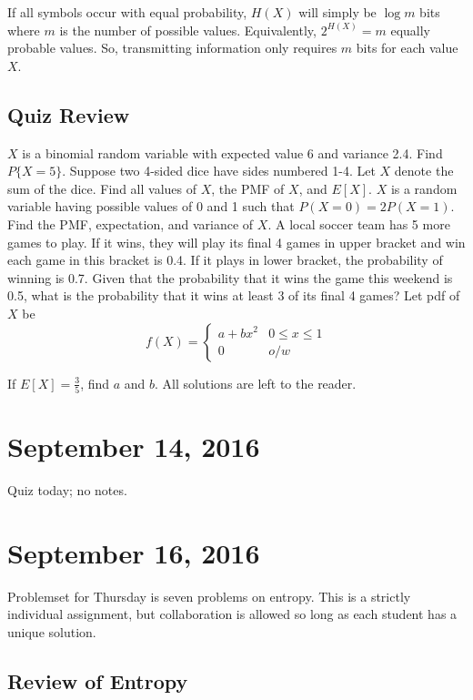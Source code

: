\documentclass[11pt]{article}
\theoremstyle{definition}
\begin{document}
\remark If all symbols occur with equal probability, $H(X)$ will simply be $\log m$ bits where $m$ is the number of possible values. Equivalently, $2^{H(X)} = m$ equally probable values. So, transmitting information only requires $m$ bits for each value $X$. 

\subsection{Quiz Review}

\example $X$ is a binomial random variable with expected value 6 and variance 2.4. Find $P\{X=5\}$.
\example Suppose two 4-sided dice have sides numbered 1-4. Let $X$ denote the sum of the dice. Find all values of $X$, the PMF of $X$, and $E[X]$.
\example $X$ is a random variable having possible values of 0 and 1 such that $P(X=0) = 2P(X=1)$. Find the PMF, expectation, and variance of $X$. 
\example A local soccer team has 5 more games to play. If it wins, they will play its final 4 games in upper bracket and win each game in this bracket is 0.4. If it plays in lower bracket, the probability of winning is 0.7. Given that the probability that it wins the game this weekend is 0.5, what is the probability that it wins at least 3 of its final 4 games?
\example Let pdf of $X$ be
\begin{equation*} f(X) =	 \begin{cases}
								a + b x^2 & 0 \leq x \leq 1\\
								0 & o/w
							\end{cases}
\end{equation*}

\noindent If $E[X] = \frac{3}{5}$, find $a$ and $b$. All solutions are left to the reader. 

\section{September 14, 2016}

Quiz today; no notes. 

\section{September 16, 2016}

Problemset for Thursday is seven problems on entropy. This is a strictly individual assignment, but collaboration is allowed so long as each student has a unique solution. 

\subsection{Review of Entropy}
\end{document}
